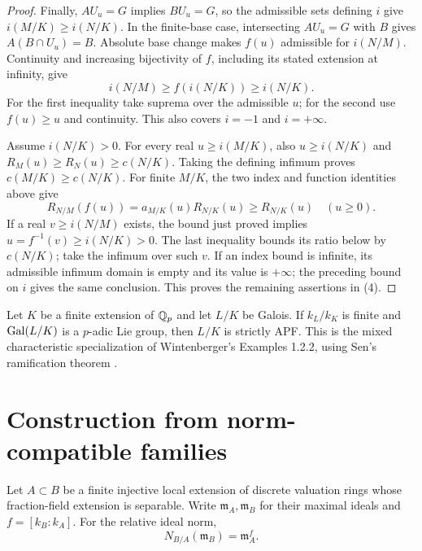 \begin{proof}
Finally, $AU_u=G$ implies $BU_u=G$, so the admissible sets defining
$i$ give $i(M/K)\geq i(N/K)$. In the finite-base case, intersecting
$AU_u=G$ with $B$ gives $A(B\cap U_u)=B$. Absolute base change makes
$f(u)$ admissible for $i(N/M)$. Continuity and increasing bijectivity
of $f$, including its stated extension at infinity, give
\[
 i(N/M)\geq f(i(N/K))\geq i(N/K).
\]
For the first inequality take suprema over the admissible $u$; for the
second use $f(u)\geq u$ and continuity. This also covers $i=-1$ and
$i=+\infty$.

Assume $i(N/K)>0$. For every real $u\geq i(M/K)$, also
$u\geq i(N/K)$ and $R_M(u)\geq R_N(u)\geq c(N/K)$.
Taking the defining infimum proves $c(M/K)\geq c(N/K)$.
For finite $M/K$, the two index and function identities above give
\[
 R_{N/M}(f(u))=a_{M/K}(u)R_{N/K}(u)\geq R_{N/K}(u)
 \quad(u\geq0).
\]
If a real $v\geq i(N/M)$ exists, the bound just proved implies
$u=f^{-1}(v)\geq i(N/K)>0$. The last inequality bounds its ratio below
by $c(N/K)$; take the infimum over such $v$. If an index bound is
infinite, its admissible infimum domain is empty and its value is
$+\infty$; the preceding bound on $i$ gives the same conclusion.
This proves the remaining assertions in (4).
\end{proof}


\begin{theorem}
\label{fw:lie-apf}
\notready
Let $K$ be a finite extension of $\mathbb Q_p$ and let $L/K$ be Galois.
If $k_L/k_K$ is finite and $\operatorname{Gal}(L/K)$ is a $p$-adic Lie group,
then $L/K$ is strictly APF.
This is the mixed characteristic specialization of Wintenberger's
Examples 1.2.2, using Sen's ramification theorem \cite{Sen1972}.
\end{theorem}

\section{Construction from norm-compatible families}

\begin{lemma}
\label{fw:ideal-norm-maximal}
\mathlibok
Let $A\subset B$ be a finite injective local extension of discrete
valuation rings whose fraction-field extension is separable.
Write $\mathfrak m_A,\mathfrak m_B$ for their maximal ideals and
$f=[k_B:k_A]$. For the relative ideal norm,
\[
 N_{B/A}(\mathfrak m_B)=\mathfrak m_A^f.
\]
\end{lemma}


